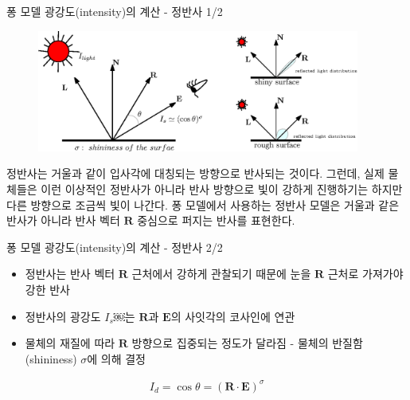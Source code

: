 \begin{frame}[fragile]{퐁 모델 광강도(intensity)의 계산 - 정반사 1/2}

\begin{figure}[h!]
  \centering
    \includegraphics[height=4cm]{Math_lighting/specularConcept.eps}
\end{figure}

정반사는 거울과 같이 입사각에 대칭되는 방향으로 반사되는 것이다. 그런데, 실제 물체들은 이런 이상적인 정반사가 아니라 반사 방향으로 빛이 강하게 진행하기는 하지만 다른 방향으로 조금씩 빛이 나간다. 퐁 모델에서 사용하는 정반사 모델은 거울과 같은 반사가 아니라 반사 벡터 $\mathbf R$ 중심으로 퍼지는 반사를 표현한다.

\end{frame}

\begin{frame}[fragile]{퐁 모델 광강도(intensity)의 계산 - 정반사 2/2}

\begin{itemize}
\item 정반사는 반사 벡터 $\mathbf R$ 근처에서 강하게 관찰되기 때문에 눈을  $\mathbf R$ 근처로 가져가야 강한 반사
\item 정반사의 광강도 $I_s$￼는 $\mathbf R$과 $\mathbf E$의 사잇각의 코사인에 연관
\item 물체의 재질에 따라 $\mathbf R$ 방향으로 집중되는 정도가 달라짐 - 물체의 반질함(shininess) $\sigma$에 의해 결정
\end{itemize}

\begin{eqnarray}
\label{eq:specularIntensity}
I_d  = \cos \theta =  (\mathbf R \cdot \mathbf E )^\sigma \nonumber
\end{eqnarray}

\end{frame}



